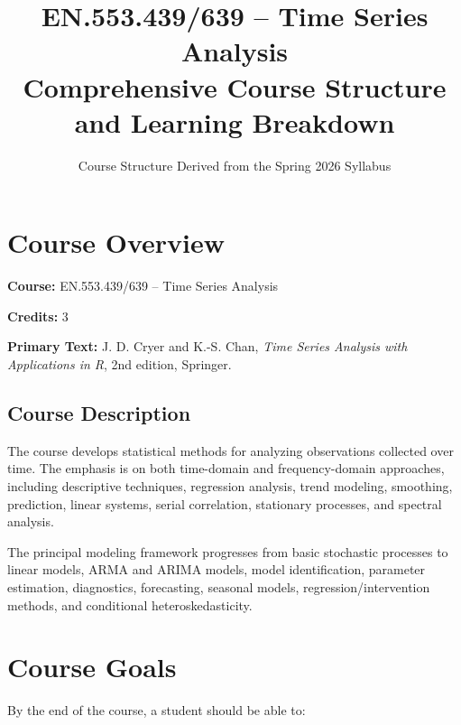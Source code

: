\documentclass[11pt]{article}
\title{
    \textbf{EN.553.439/639 -- Time Series Analysis}\\
    \large Comprehensive Course Structure and Learning Breakdown
}
\author{Course Structure Derived from the Spring 2026 Syllabus}
\date{}
\begin{document}
\maketitle

\section{Course Overview}

\textbf{Course:} EN.553.439/639 -- Time Series Analysis

\textbf{Credits:} 3

\textbf{Primary Text:}
J. D. Cryer and K.-S. Chan,
\textit{Time Series Analysis with Applications in R},
2nd edition, Springer.

\subsection{Course Description}

The course develops statistical methods for analyzing observations collected
over time. The emphasis is on both time-domain and frequency-domain
approaches, including descriptive techniques, regression analysis,
trend modeling, smoothing, prediction, linear systems, serial correlation,
stationary processes, and spectral analysis.

The principal modeling framework progresses from basic stochastic
processes to linear models, ARMA and ARIMA models, model identification,
parameter estimation, diagnostics, forecasting, seasonal models,
regression/intervention methods, and conditional heteroskedasticity.

\section{Course Goals}

By the end of the course, a student should be able to:
\end{document}
